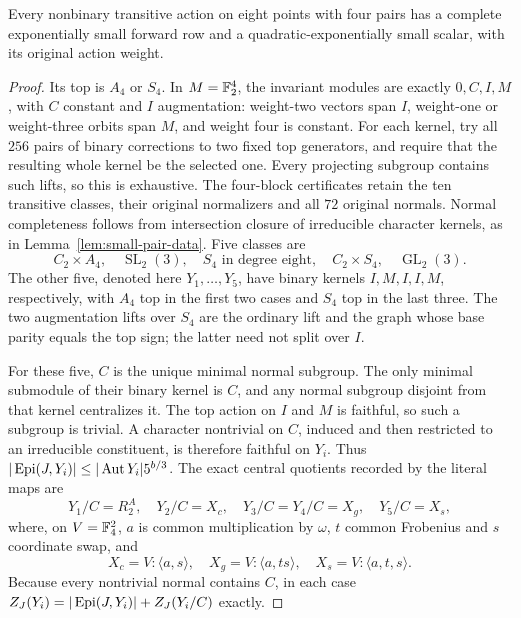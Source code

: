 \begin{proposition}\label{prop:four-pairs}
Every nonbinary transitive action on eight points with four pairs
has a complete exponentially small forward row and a
quadratic-exponentially small scalar, with its original action weight.
\end{proposition}
\begin{proof}
Its top is $A_4$ or $S_4$. In $M=\mathbb F_2^4$, the invariant modules
are exactly $0,C,I,M$, with $C$ constant and $I$ augmentation:
weight-two vectors span $I$, weight-one or weight-three orbits
span $M$, and weight four is constant. For each kernel, try all
$256$ pairs of binary corrections to two fixed top generators,
and require that the resulting whole kernel be the selected one.
Every projecting subgroup contains such lifts, so this is exhaustive.
The four-block certificates retain the ten transitive classes,
their original normalizers and all $72$ original normals. Normal
completeness follows from intersection closure of irreducible
character kernels, as in Lemma~\ref{lem:small-pair-data}.
Five classes are
\[
 C_2\times A_4,\quad\operatorname{SL}_2(3),\quad
 S_4\text{ in degree eight},\quad C_2\times S_4,\quad
 \operatorname{GL}_2(3).
\]
The other five, denoted here $Y_1,\ldots,Y_5$, have binary kernels
$I,M,I,I,M$, respectively, with $A_4$ top in the first two cases
and $S_4$ top in the last three. The two augmentation lifts over
$S_4$ are the ordinary lift and the graph whose base parity equals
the top sign; the latter need not split over $I$.

For these five, $C$ is the unique minimal normal subgroup. The
only minimal submodule of their binary kernel is $C$, and any
normal subgroup disjoint from that kernel centralizes it. The
top action on $I$ and $M$ is faithful, so such a subgroup is
trivial. A character nontrivial on $C$, induced and then restricted
to an irreducible constituent, is therefore faithful on $Y_i$.
Thus $|\operatorname{Epi}(J,Y_i)|\leq|\operatorname{Aut} Y_i|5^{b/3}$. The exact central
quotients recorded by the literal maps are
\[
 Y_1/C=R_2^A,\quad Y_2/C=X_c,\quad
 Y_3/C=Y_4/C=X_g,\quad Y_5/C=X_s,
\]
where, on $V=\mathbb F_4^2$, $a$ is common multiplication by $\omega$,
$t$ common Frobenius and $s$ coordinate swap, and
\[
 X_c=V:\langle a,s\rangle,\quad
 X_g=V:\langle a,ts\rangle,\quad
 X_s=V:\langle a,t,s\rangle.
\]
Because every nontrivial normal contains $C$, in each case
$Z_J(Y_i)=|\operatorname{Epi}(J,Y_i)|+Z_J(Y_i/C)$ exactly.


\end{proof}
